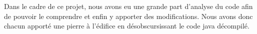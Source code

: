 
Dans le cadre de ce projet, nous avons eu une grande part d'analyse du code afin
de pouvoir le comprendre et enfin y apporter des modifications.
Nous avons donc chacun apporté une pierre à l'édifice en désobscursissant le code java décompilé.

